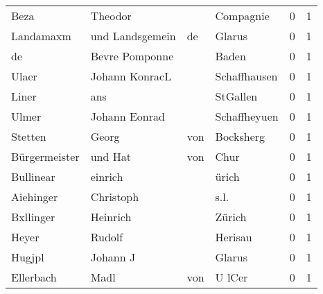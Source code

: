 \begin{tabular}{llllrr}
                     Beza &                            Theodor &             &                                   Compagnie &          0 &         1 \\
                Landamaxm &                    und Landsgemein &          de &                                      Glarus &          0 &         1 \\
                       de &                     Bevre Pomponne &             &                                       Baden &          0 &         1 \\
                    Ulaer &                     Johann KonracL &             &                                Schaffhausen &          0 &         1 \\
                    Liner &                                ans &             &                                    StGallen &          0 &         1 \\
                    Ulmer &                      Johann Eonrad &             &                                Schaffheyuen &          0 &         1 \\
                  Stetten &                              Georg &         von &                                   Bocksherg &          0 &         1 \\
            Bürgermeister &                            und Hat &         von &                                        Chur &          0 &         1 \\
                Bullinear &                            einrich &             &                                       ürich &          0 &         1 \\
                Aiehinger &                          Christoph &             &                                        s.l. &          0 &         1 \\
                Bxllinger &                           Heinrich &             &                                      Zürich &          0 &         1 \\
                    Heyer &                             Rudolf &             &                                     Herisau &          0 &         1 \\
                   Hugjpl &                           Johann J &             &                                      Glarus &          0 &         1 \\
                Ellerbach &                               Madl &         von &                                      U lCer &          0 &         1 \\

\end{tabular}
